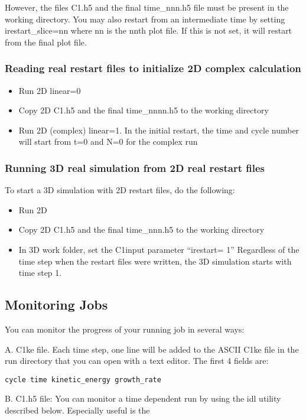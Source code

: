 However, the files C1.h5 and the final time\_nnn.h5 file must be present in the working directory. You may also
restart from an intermediate time by setting irestart\_slice=nn where nn is the nnth plot file. If this is not
set, it will restart from the final plot file. 

\subsubsection{Reading real restart files to initialize 2D complex calculation}
\begin{itemize}
\item  Run 2D linear=0
\item  Copy 2D C1.h5 and the final time\_nnnn.h5 to the working directory
\item  Run 2D (complex) linear=1. In the initial restart, the time and cycle number will start from t=0
and N=0 for the complex run
\end{itemize}

\subsubsection{Running 3D real simulation from 2D real restart files}
To start a 3D simulation with 2D restart files, do the following:
\begin{itemize}
\item  Run 2D
\item  Copy 2D C1.h5 and the final time\_nnn.h5 to the working directory
\item  In 3D work folder, set the C1input parameter “irestart= 1”
Regardless of the time step when the restart files were written, the 3D simulation starts with time step 1. 
\end{itemize}

\subsection{Monitoring Jobs}
You can monitor the progress of your running job in several ways:

A. C1ke file. Each time step, one line will be added to the ASCII C1ke file in the run directory that you can open with a text editor. The first 4 fields are:

\begin{verbatim}
cycle time kinetic_energy growth_rate
\end{verbatim}

B. C1.h5 file: You can monitor a time dependent run by using the idl utility described below.  Especially useful is the 

